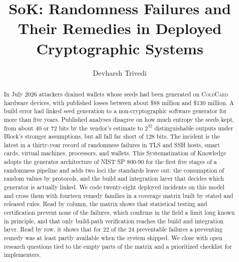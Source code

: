 \documentclass[runningheads]{llncs}
\newcommand{\coldcard}{\textsc{ColdCard}}
\newcommand{\bits}[1]{$2^{#1}$}
\begin{document}
\title{SoK: Randomness Failures and Their Remedies in Deployed Cryptographic Systems}

\author{Devharsh Trivedi}

\maketitle

\begin{abstract}
In July 2026 attackers drained wallets whose seeds had been generated on \coldcard{} hardware
devices, with published losses between about \$88 million and \$130 million. A build error had linked
seed generation to a non-cryptographic software generator for more than five years. Published
analyses disagree on how much entropy the seeds kept, from about 40 or 72 bits by the vendor's
estimate to \bits{32} distinguishable outputs under Block's stronger assumptions, but all fall far
short of 128 bits. The incident is the latest in a thirty-year record of randomness failures in
TLS and SSH hosts, smart cards, virtual machines, processors, and wallets. This Systematization
of Knowledge adopts the generator architecture of NIST SP 800-90 for the first five stages of a
randomness pipeline and adds two loci the standards leave out: the consumption of random values
by protocols, and the build and integration layer that decides which generator is actually
linked. We code twenty-eight deployed incidents on this model and cross them with fourteen remedy
families in a coverage matrix built by stated and released rules. Read by column, the matrix
shows that statistical testing and certification prevent none of the failures, which confirms
in the field a limit long known in principle, and that only build-path verification reaches the
build and integration layer. Read by row, it shows that for 22 of the 24 preventable failures a
preventing remedy was at least partly available when the system shipped. We close with open
research questions tied to the empty parts of the matrix and a prioritized checklist for
implementers.

\end{abstract}
\end{document}
